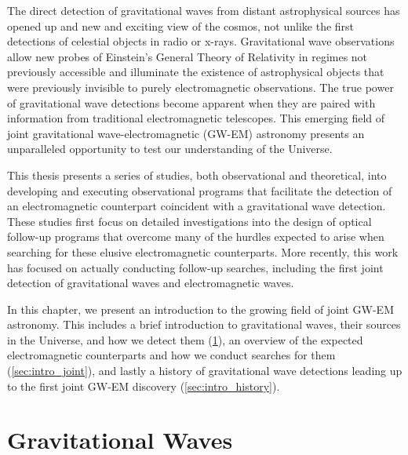 The direct detection of gravitational waves from distant astrophysical sources has opened up and new and exciting view of the cosmos, not unlike the first detections of celestial objects in radio or x-rays. Gravitational wave observations allow new probes of Einstein's General Theory of Relativity in regimes not previously accessible and illuminate the existence of astrophysical objects that were previously invisible to purely electromagnetic observations. The true power of gravitational wave detections become apparent when they are paired with information from traditional electromagnetic telescopes. This emerging field of joint gravitational wave-electromagnetic (GW-EM) astronomy presents an unparalleled opportunity to test our understanding of the Universe.

This thesis presents a series of studies, both observational and theoretical, into developing and executing observational programs that facilitate the detection of an electromagnetic counterpart coincident with a gravitational wave detection. These studies first focus on detailed investigations into the design of optical follow-up programs that overcome many of the hurdles expected to arise when searching for these elusive electromagnetic counterparts. More recently, this work has focused on actually conducting follow-up searches, including the first joint detection of gravitational waves and electromagnetic waves.

In this chapter, we present an introduction to the growing field of joint GW-EM astronomy. This includes a brief introduction to gravitational waves, their sources in the Universe, and how we detect them (\cref{sec:intro_gw}), an overview of the expected electromagnetic counterparts and how we conduct searches for them (\cref{sec:intro_joint}), and lastly a history of gravitational wave detections leading up to the first joint GW-EM discovery (\cref{sec:intro_history}).

\section{Gravitational Waves}
\label{sec:intro_gw}
